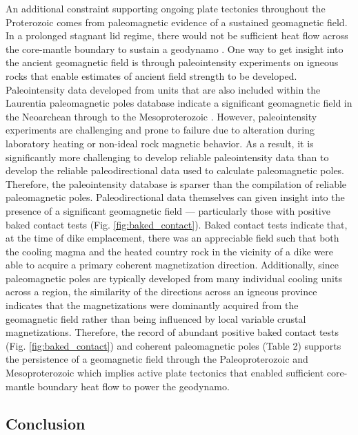 \documentclass[twocolumn, switch]{article} %
\begin{document}
An additional constraint supporting ongoing plate tectonics throughout the Proterozoic comes from paleomagnetic evidence of a sustained geomagnetic field. In a prolonged stagnant lid regime, there would not be sufficient heat flow across the core-mantle boundary to sustain a geodynamo \citep{Nimmo2000a, Buffett2000b}. One way to get insight into the ancient geomagnetic field is through paleointensity experiments on igneous rocks that enable estimates of ancient field strength to be developed.  Paleointensity data developed from units that are also included within the Laurentia paleomagnetic poles database indicate a significant geomagnetic field in the Neoarchean \citep{Selkin2000a} through to the Mesoproterozoic \citep{Macouin2006a, Sprain2018a}. However, paleointensity experiments are challenging and prone to failure due to alteration during laboratory heating or non-ideal rock magnetic behavior. As a result, it is significantly more challenging to develop reliable paleointensity data than to develop the reliable paleodirectional data used to calculate paleomagnetic poles. Therefore, the paleointensity database is sparser than the compilation of reliable paleomagnetic poles. Paleodirectional data themselves can given insight into the presence of a significant geomagnetic field --- particularly those with positive baked contact tests (Fig. \ref{fig:baked_contact}). Baked contact tests indicate that, at the time of dike emplacement, there was an appreciable field such that both the cooling magma and the heated country rock in the vicinity of a dike were able to acquire a primary coherent magnetization direction. Additionally, since paleomagnetic poles are typically developed from many individual cooling units across a region, the similarity of the directions across an igneous province indicates that the magnetizations were dominantly acquired from the geomagnetic field rather than being influenced by local variable crustal magnetizations.  Therefore, the record of abundant positive baked contact tests (Fig. \ref{fig:baked_contact}) and coherent paleomagnetic poles (Table 2) supports the persistence of a geomagnetic field through the Paleoproterozoic and Mesoproterozoic which implies active plate tectonics that enabled sufficient core-mantle boundary heat flow to power the geodynamo.

\subsection{Conclusion}
\end{document}
